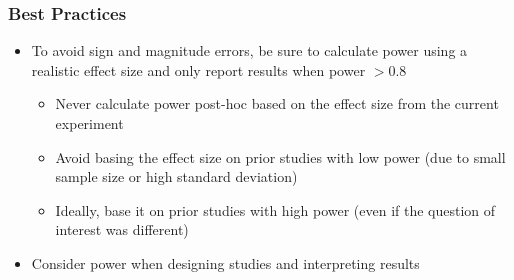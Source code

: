 \documentclass[slidestop,compress,mathserif]{beamer}
\begin{document}
\begin{frame}
	\frametitle{Best Practices}
	\begin{itemize}
		\item To avoid sign and magnitude errors, be sure to calculate power using a realistic effect size and only report results when power $>0.8$
		\begin{itemize}
			\item Never calculate power post-hoc based on the effect size from the current experiment
			\item Avoid basing the effect size on prior studies with low power (due to small sample size or high standard deviation)
			\item Ideally, base it on prior studies with high power (even if the question of interest was different)
		\end{itemize}
		\item Consider power when designing studies and interpreting results
	\end{itemize}
\end{frame}


\end{document}
